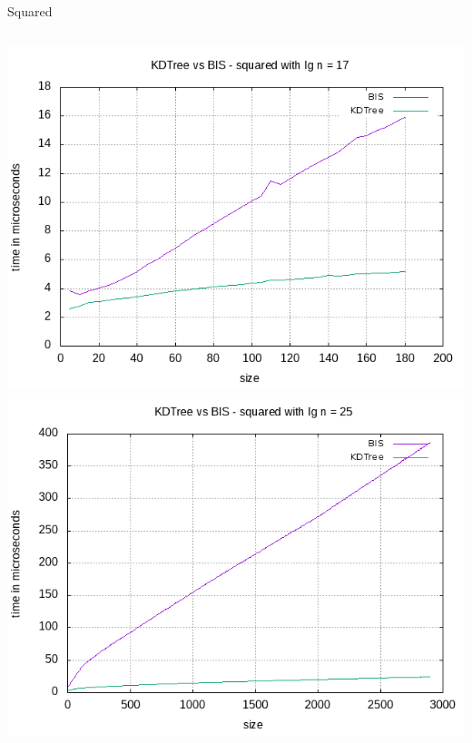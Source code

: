 \documentclass[pdf]{beamer}
\begin{document}
\begin{frame}{Squared}
  \begin{columns}
    \includegraphics[scale=0.32]{pictures/analysis/sqrt_17.png}
    \includegraphics[scale=0.32]{pictures/analysis/sqrt_25.png}
  \end{columns}
\end{frame}
\end{document}
